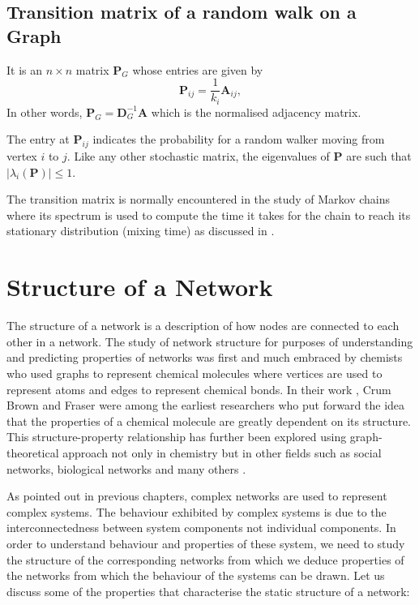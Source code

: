 \documentclass[10pt,a4paper]{article}
\theoremstyle{plain}
\theoremstyle{definition}
\begin{document}
\subsection{Transition matrix of a random walk on a Graph}
It is an $n \times n$ matrix $\mathbf{P}_G$ whose entries are given by
\begin{equation}
\mathbf{P}_{ij} = \frac{1}{k_i} \mathbf{A}_{ij},
\end{equation}
In other words, $\mathbf{P}_G = \mathbf{D}_{G} ^ {-1} \mathbf{A}$ which is the normalised adjacency matrix.

The entry at $\mathbf{P}_{ij}$ indicates the probability for a random walker moving from vertex $i$ to $j$. Like any other stochastic matrix, the eigenvalues of $\mathbf{P}$ are such that $|\lambda_i(\mathbf{P})| \leq 1$.

The transition matrix is normally encountered in the study of Markov chains where its spectrum is used to compute the time it takes for the chain to reach its stationary distribution (mixing time) as discussed in \citep{behrends2000introduction}.



\section{Structure of a Network}

The structure of a network is a description of how nodes are connected to each other in a network. 
The study of network structure for purposes of understanding and predicting properties of networks was first and much embraced by chemists who used graphs to represent chemical molecules where vertices are used to represent atoms and edges to represent chemical
bonds.  In their work \citep{brown1868connection}, Crum Brown and Fraser were among the earliest researchers who put forward the idea that the properties of a chemical molecule are greatly dependent on its structure.  This structure-property relationship has further been explored using graph-theoretical approach not only in chemistry but in other fields such as social networks, biological networks and many others \citep{mihalic1992graph,smith2004associations,wellman1988social,wey2008social}.  

As pointed out in previous chapters, complex networks are used to represent complex systems. The behaviour exhibited by complex systems is due to the interconnectedness between system components not individual components. In order to understand behaviour and properties of these system, we need to study the structure of the corresponding networks from which we deduce properties of the networks from which the behaviour of the systems can be drawn. Let us discuss some of the properties that characterise the static structure of a network:
\end{document}
